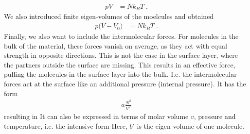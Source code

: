 %
\begin{align*}
p V &= N k_{B} T\;.
\end{align*}
%
We also introduced finite eigen-volumes of the moelcules and obtained
%
\begin{align*}
p \big(V- V_{0}\big) &= N k_{B} T\;.
\end{align*}
%
Finally, we also want to include the intermolecular forces. For molecules in the bulk of the 
material, these forces vanish on average, as they act with equal strength in opposite directions.
This is not the case in the surface layer, where the partners outside the surface are missing.
This results in an effective force, pulling the molecules  in the surface layer into the bulk. I.e.
the intermolecular forces act at the surface like an additional pressure (internal pressure).
It has the form 
%
\begin{align*}
a \frac{N^{2}}{V^{2}}
\end{align*}
%
resulting in 
It can also be expressed in terms of molar volume $v$, pressure and temperature, i.e.
the intensive form 
Here, $b'$ is the eigen-volume of one molecule.


